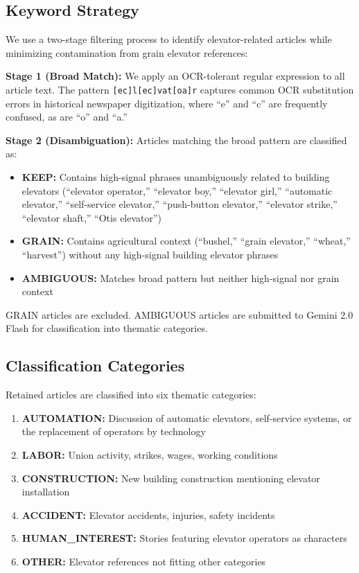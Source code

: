 \documentclass[12pt]{article}
\begin{document}
\subsection{Keyword Strategy}

We use a two-stage filtering process to identify elevator-related articles while minimizing contamination from grain elevator references:

\textbf{Stage 1 (Broad Match):} We apply an OCR-tolerant regular expression to all article text. The pattern \texttt{[ec]l[ec]vat[oa]r} captures common OCR substitution errors in historical newspaper digitization, where ``e'' and ``c'' are frequently confused, as are ``o'' and ``a.''

\textbf{Stage 2 (Disambiguation):} Articles matching the broad pattern are classified as:
\begin{itemize}
  \item \textbf{KEEP:} Contains high-signal phrases unambiguously related to building elevators (``elevator operator,'' ``elevator boy,'' ``elevator girl,'' ``automatic elevator,'' ``self-service elevator,'' ``push-button elevator,'' ``elevator strike,'' ``elevator shaft,'' ``Otis elevator'')
  \item \textbf{GRAIN:} Contains agricultural context (``bushel,'' ``grain elevator,'' ``wheat,'' ``harvest'') without any high-signal building elevator phrases
  \item \textbf{AMBIGUOUS:} Matches broad pattern but neither high-signal nor grain context
\end{itemize}

GRAIN articles are excluded. AMBIGUOUS articles are submitted to Gemini 2.0 Flash for classification into thematic categories.

\subsection{Classification Categories}

Retained articles are classified into six thematic categories:
\begin{enumerate}
  \item \textbf{AUTOMATION:} Discussion of automatic elevators, self-service systems, or the replacement of operators by technology
  \item \textbf{LABOR:} Union activity, strikes, wages, working conditions
  \item \textbf{CONSTRUCTION:} New building construction mentioning elevator installation
  \item \textbf{ACCIDENT:} Elevator accidents, injuries, safety incidents
  \item \textbf{HUMAN\_INTEREST:} Stories featuring elevator operators as characters
  \item \textbf{OTHER:} Elevator references not fitting other categories
\end{enumerate}
\end{document}
